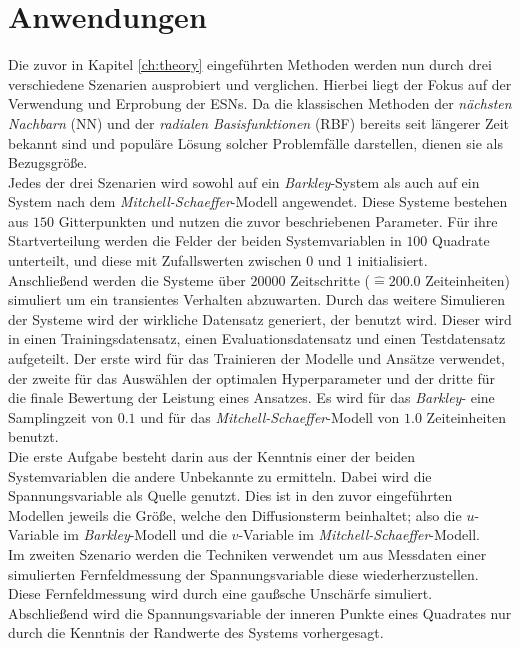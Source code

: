 \chapter{Anwendungen}
\label{ch:experiments}

Die zuvor in Kapitel \ref{ch:theory} eingeführten Methoden werden nun durch drei verschiedene Szenarien ausprobiert und verglichen. Hierbei liegt der Fokus auf der Verwendung und Erprobung der \textsc{ESN}s. Da die klassischen Methoden der \textit{nächsten Nachbarn} (\textsc{NN}) und der \textit{radialen Basisfunktionen} (\textsc{RBF}) bereits seit längerer Zeit bekannt sind und populäre Lösung solcher Problemfälle darstellen, dienen sie als Bezugsgröße.\\

Jedes der drei Szenarien wird sowohl auf ein \textit{Barkley}-System als auch auf ein System nach dem \textit{Mitchell-Schaeffer}-Modell angewendet. Diese Systeme bestehen aus $150$ Gitterpunkten und nutzen die zuvor beschriebenen Parameter. Für ihre Startverteilung werden die Felder der beiden Systemvariablen in $100$ Quadrate unterteilt, und diese mit Zufallswerten zwischen $0$ und $1$ initialisiert. Anschließend werden die Systeme über $20000$ Zeitschritte ($\widehat{=} 200.0$ Zeiteinheiten) simuliert um ein transientes Verhalten abzuwarten. Durch das weitere Simulieren der Systeme wird der wirkliche Datensatz generiert, der benutzt wird. Dieser wird in einen Trainingsdatensatz, einen Evaluationsdatensatz und einen Testdatensatz aufgeteilt. Der erste wird für das Trainieren der Modelle und Ansätze verwendet, der zweite für das Auswählen der optimalen Hyperparameter und der dritte für die finale Bewertung der Leistung eines Ansatzes. Es wird für das \textit{Barkley}- eine Samplingzeit von $0.1$ und für das \textit{Mitchell-Schaeffer}-Modell von $1.0$ Zeiteinheiten benutzt.\\
 
Die erste Aufgabe besteht darin aus der Kenntnis einer der beiden Systemvariablen die andere Unbekannte zu ermitteln. Dabei wird die Spannungsvariable als Quelle genutzt. Dies ist in den zuvor eingeführten Modellen jeweils die Größe, welche den Diffusionsterm beinhaltet; also die $u$-Variable im \textit{Barkley}-Modell und die $v$-Variable im \textit{Mitchell-Schaeffer}-Modell.\\
Im zweiten Szenario werden die Techniken verwendet um aus Messdaten einer simulierten Fernfeldmessung der Spannungsvariable  diese wiederherzustellen. Diese Fernfeldmessung wird durch eine gaußsche Unschärfe simuliert.\\
Abschließend wird die Spannungsvariable der inneren Punkte eines Quadrates nur durch die Kenntnis der Randwerte des Systems vorhergesagt.\\

